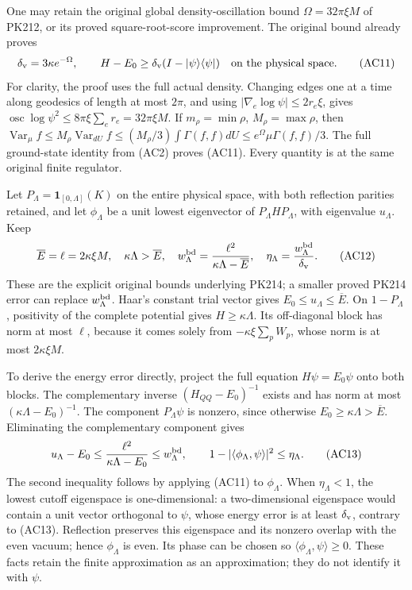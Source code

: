 \documentclass[11pt]{article}
\begin{document}
One may retain the original global density-oscillation bound \(\Omega=32\pi\xi M\) of PK212, or its proved square-root-score improvement. The original bound already proves
\[
 \delta_{\rm v}=3\kappa e^{-\Omega},\qquad
 H-E_0\ge\delta_{\rm v}(I-|\psi\rangle\langle\psi|)
              \quad\hbox{on the physical space}.
 \tag{AC11}
\]
For clarity, the proof uses the full actual density. Changing edges one at a time along geodesics of length at most \(2\pi\), and using \(|\nabla_e\log\psi|\le2r_e\xi\), gives \(\operatorname{osc}\log\psi^2\le8\pi\xi\sum_er_e=32\pi\xi M\). If \(m_\rho=\min\rho\), \(M_\rho=\max\rho\), then
\(\operatorname{Var}_\mu f\le M_\rho\operatorname{Var}_{dU}f\le(M_\rho/3)\int\Gamma(f,f)dU\le e^\Omega\mu\Gamma(f,f)/3\).
The full ground-state identity from (AC2) proves (AC11). Every quantity is at the same original finite regulator.

Let \(P_\Lambda=\mathbf1_{[0,\Lambda]}(K)\) on the entire physical space, with both reflection parities retained, and let \(\phi_\Lambda\) be a unit lowest eigenvector of \(P_\Lambda H P_\Lambda\), with eigenvalue \(u_\Lambda\). Keep
\[
 \overline E=\ell=2\kappa\xi M,\quad
 \kappa\Lambda>\overline E,\quad
 w_\Lambda^{\rm bd}=\frac{\ell^2}{\kappa\Lambda-\overline E},\quad
 \eta_\Lambda=\frac{w_\Lambda^{\rm bd}}{\delta_{\rm v}}.
 \tag{AC12}
\]
These are the explicit original bounds underlying PK214; a smaller proved PK214 error can replace \(w_\Lambda^{\rm bd}\). Haar's constant trial vector gives \(E_0\le u_\Lambda\le\overline E\). On \(1-P_\Lambda\), positivity of the complete potential gives \(H\ge\kappa\Lambda\). Its off-diagonal block has norm at most \(\ell\), because it comes solely from \(-\kappa\xi\sum_pW_p\), whose norm is at most \(2\kappa\xi M\).

To derive the energy error directly, project the full equation \(H\psi=E_0\psi\) onto both blocks. The complementary inverse \((H_{QQ}-E_0)^{-1}\) exists and has norm at most \((\kappa\Lambda-E_0)^{-1}\). The component \(P_\Lambda\psi\) is nonzero, since otherwise \(E_0\ge\kappa\Lambda>\overline E\). Eliminating the complementary component gives
\[
 u_\Lambda-E_0
 \le \frac{\ell^2}{\kappa\Lambda-E_0}
 \le w_\Lambda^{\rm bd},\qquad
 1-|\langle\phi_\Lambda,\psi\rangle|^2\le\eta_\Lambda.
 \tag{AC13}
\]
The second inequality follows by applying (AC11) to \(\phi_\Lambda\). When \(\eta_\Lambda<1\), the lowest cutoff eigenspace is one-dimensional: a two-dimensional eigenspace would contain a unit vector orthogonal to \(\psi\), whose energy error is at least \(\delta_{\rm v}\), contrary to (AC13). Reflection preserves this eigenspace and its nonzero overlap with the even vacuum; hence \(\phi_\Lambda\) is even. Its phase can be chosen so \(\langle\phi_\Lambda,\psi\rangle\ge0\). These facts retain the finite approximation as an approximation; they do not identify it with \(\psi\).
\end{document}
